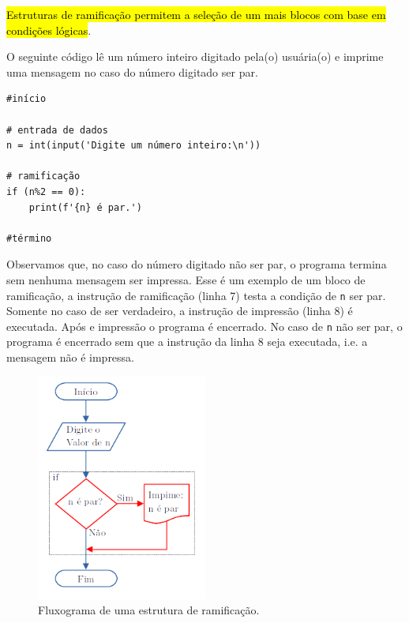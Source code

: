 \hl{Estruturas de ramificação permitem a seleção de um mais blocos com base em condições lógicas}.

\begin{ex}\label{cap_progest_sec_est:ex:ramifica}
  O seguinte código lê um número inteiro digitado pela(o) usuária(o) e imprime uma mensagem no caso do número digitado ser par.

\begin{lstlisting}
#início

# entrada de dados
n = int(input('Digite um número inteiro:\n'))

# ramificação
if (n%2 == 0):
    print(f'{n} é par.')

#término
\end{lstlisting}

Observamos que, no caso do número digitado não ser par, o programa termina sem nenhuma mensagem ser impressa. Esse é um exemplo de um bloco de ramificação, a instrução de ramificação (linha 7) testa a condição de \lstinline+n+ ser par. Somente no caso de ser verdadeiro, a instrução de impressão (linha 8) é executada. Após e impressão o programa é encerrado. No caso de \lstinline+n+ não ser par, o programa é encerrado sem que a instrução da linha 8 seja executada, i.e. a mensagem não é impressa.

\begin{figure}[H]
  \centering
  \includegraphics[width=0.5\textwidth]{./cap_progest/dados/fig_fg_ramifica/fig}
  \caption{Fluxograma de uma estrutura de ramificação.}
  \label{cap_progest:fig:fg_ramifica}
\end{figure}
  
\end{ex}

